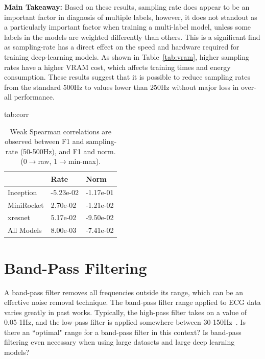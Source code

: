 \documentclass[pmlr,twocolumn]{jmlr}%
\begin{document}
\textbf{Main Takeaway:} Based on these results, sampling rate does appear to be an important factor in diagnosis of multiple labels, however, it does not standout as a particularly important factor when training a multi-label model, unless some labels in the models are weighted differently than others.  This is a significant find as sampling-rate has a direct effect on the speed and hardware required for training deep-learning models. As shown in Table~\ref{tab:vram}, higher sampling rates have a higher VRAM cost, which affects training times and energy consumption. These results suggest that it is possible to reduce sampling rates from the standard 500Hz to values lower than 250Hz without major loss in over-all performance. 


\begin{table}[!tbp]
\floatconts
  {tab:corr}
  {\vspace*{-6mm}\caption{Weak Spearman correlations are observed between F1 and sampling-rate (50-500Hz), and F1 and norm. ($0\xrightarrow{}$raw, $1\xrightarrow{}$min-max).}}
  {\vspace*{-6mm}\begin{tabular}{|l|l|l|}
  \hline
   & \bfseries Rate & \bfseries Norm \\\hline
  
  Inception  & -5.23e-02 & -1.17e-01  \\
  MiniRocket &  2.70e-02 & -1.21e-02  \\
  xresnet    & 5.17e-02 & -9.50e-02 \\
  \hline
  All Models & 8.00e-03 & -7.41e-02\\
  \hline
  \end{tabular}\vspace*{-1mm}}
\end{table}

\section{Band-Pass Filtering}
\label{sec:BandPass}
A band-pass filter removes all frequencies outside its range, which can be an effective noise removal technique. The band-pass filter range applied to ECG data varies greatly in past works. Typically, the high-pass filter takes on a value of 0.05-1Hz, and the low-pass filter is applied somewhere between 30-150Hz~\citep{uwaechia2021comprehensive,luo2010review}. Is there an ``optimal" range for a band-pass filter in this context? Is band-pass filtering even necessary when using large datasets and large deep learning models?
\end{document}
